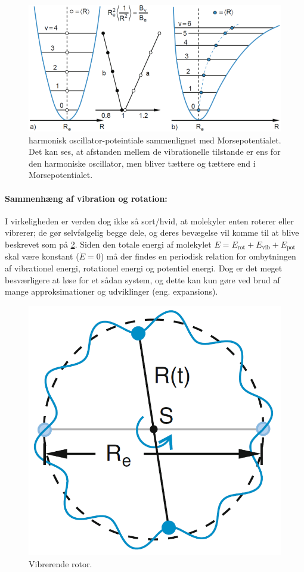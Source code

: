 \begin{figure}[!h]
    \centering
    \includegraphics[width=.8\textwidth]{Q20/images/AfstandMellemEnerginiveauerneIToForskelligePotentialleApproksimationer.PNG}
    \caption{harmonisk oscillator-poteintiale sammenlignet med Morsepotentialet. Det kan ses, at afstanden mellem de vibrationelle tilstande er ens for den harmoniske oscillator, men bliver tættere og tættere end i Morsepotentialet.}
    \label{fig:Q20_AfstandMellemEnerginiveauer}
\end{figure}


\paragraph{Sammenhæng af vibration og rotation:} I virkeligheden er verden dog ikke så sort/hvid, at molekyler enten roterer eller vibrerer; de gør selvfølgelig begge dele, og deres bevægelse vil komme til at blive beskrevet som på \cref{fig:Q20_VibratingRotor}. Siden den totale energi af molekylet $E = E_\text{rot} + E_\text{vib} + E_\text{pot}$ skal være konstant ($\Dot{E} = 0$) må der findes en periodisk relation for ombytningen af vibrationel energi, rotationel energi og potentiel energi. Dog er det meget besværligere at løse for et sådan system, og dette kan kun gøre ved brud af mange approksimationer og udviklinger (eng. expansions).

\begin{figure}[!h]
    \centering
    \includegraphics[width=.35\textwidth]{Q20/images/VibratingRotor.PNG}
    \caption{Vibrerende rotor.}
    \label{fig:Q20_VibratingRotor}
\end{figure}

